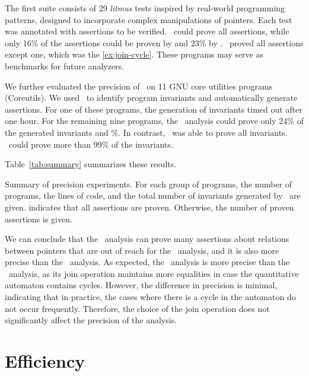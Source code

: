 The first suite consists of 29 \emph{litmus} tests inspired by real-world programming patterns,
designed to incorporate complex manipulations of pointers.
Each test was annotated with assertions to be verified.
\cpou\ could prove all assertions,
while only 16\% of the assertions could be proven by \base
and 23\% by \vareq.
\cpod\ proved all assertions except one, which was the \cref{ex:join-cycle}.
These programs may serve as benchmarks for future analyzers.

We further evaluated the precision of \cpo\ on 11 GNU core utilities programs (Coreutils).
We used \cpou\ to identify program invariants and automatically generate assertions.
For one of these programs, the generation of invariants timed out after one hour.
For the remaining nine programs, the \base\ analysis could prove only 24\% of the generated invariants
and \%.
In contrast, \cpou\ was able to prove all invariants.
\cpod\ could prove more than 99\% of the invariants.

Table~\ref{tab:summary} summarizes these results.

\begin{table}[t]
    \centering
    \caption[Results of experiments on litmus tests and Coreutils.]{Summary of precision experiments. For each group of programs, the number of programs, the lines of code, and the total number of invariants generated by \cpou\ are given.
         indicates that all assertions are proven. Otherwise, the number of proven assertions is given.}\label{tab:summary}
    
\end{table}

We can conclude that the \cpo\ analysis can prove many assertions about relations between pointers that are out of reach for the \base\ analysis, and it is also more precise than the \vareq\ analysis.
As expected, the \cpou\ analysis is more precise than the \cpod\ analysis, as its join operation maintains more equalities in case the quantitative automaton contains cycles.
However, the difference in precision is minimal, indicating that in practice, the cases where there is a cycle in the automaton do not occur frequently.
Therefore, the choice of the join operation does not significantly affect the precision of the analysis.

\section{Efficiency}

